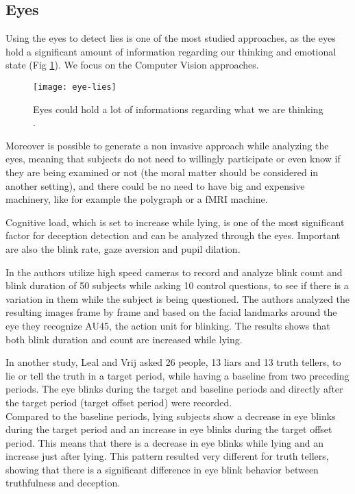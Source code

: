 \subsection*{Eyes}
Using the eyes to detect lies is one of the most studied approaches, as the eyes hold a significant amount of information regarding our thinking and emotional state \cite{FUKUDA2001239} (Fig \ref{fig:eye-lies}). We focus on the Computer Vision approaches.

\begin{figure}[H]
	\centering
	\texttt{[image: eye-lies]}
	\caption{Eyes could hold a lot of informations regarding what we are thinking \cite{eyeLies}.}
	\label{fig:eye-lies}
\end{figure}

Moreover is possible to generate a non invasive approach while analyzing the eyes, meaning that subjects do not need to willingly participate or even know if they are being examined or not (the moral matter should be considered in another setting), and there could be no need to have big and expensive machinery, like for example the polygraph or a fMRI machine.

Cognitive load, which is set to increase while lying, is one of the most significant factor for deception detection and can be analyzed through the eyes. Important are also the blink rate, gaze aversion and pupil dilation.

In \cite{8125844} the authors utilize high speed cameras to record and analyze blink count and blink duration of 50 subjects while asking 10 control questions, to see if there is a variation in them while the subject is being questioned. The authors analyzed the resulting images frame by frame and based on the facial landmarks around the eye they recognize AU45, the action unit for blinking. The results shows that both blink duration and count are increased while lying.

In another study, Leal and Vrij \cite{Leal2008} asked 26 people, 13 liars and 13 truth tellers, to lie or tell the truth in a target period, while having a baseline from two preceding periods. The eye blinks during the target and baseline periods and directly after the target period (target offset period) were recorded.\\
Compared to the baseline periods, lying subjects show a decrease in eye blinks during the target period and an increase in eye blinks during the target offset period. This means that there is a decrease in eye blinks while lying and an increase just after lying. This pattern resulted very different for truth tellers, showing that there is a significant difference in eye blink behavior between truthfulness and deception.

